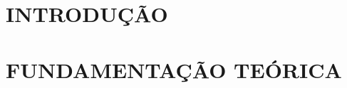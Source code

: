 \documentclass[12pt,a4paper]{article}
\begin{document}
	\newpage


	\section{INTRODUÇÃO}
		
	\newpage


	\section{FUNDAMENTAÇÃO TEÓRICA}


\end{document}
